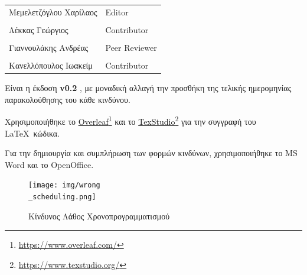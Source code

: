 \documentclass{../ol-softwaremanual}
\newcommand{\doclink}[2]{\href{#1}{#2}\footnote{\url{#1}}}
\begin{document}
	
	\vspace{20pt}
	
	\begin{table}[htbp!]
		\begin{tabular}{ll}
			Μεμελετζόγλου Χαρίλαος & \en Editor \\
			\\ Λέκκας Γεώργιος      &   \en  Contributor \\
			\\ Γιαννουλάκης Ανδρέας & \en Peer Reviewer \\
			\\ Κανελλόπουλος Ιωακείμ & \en Contributor \\ 
		\end{tabular}
	\end{table}
	
	\vspace{10pt}
	\flushleft
	Είναι η έκδοση \en \textbf{v0.2} \gr, με μοναδική αλλαγή την προσθήκη της τελικής ημερομηνίας παρακολούθησης του κάθε κινδύνου.
	
	
	
	
	
	\vspace{20pt}
	\flushleft
	Χρησιμοποιήθηκε το \en \doclink{https://www.overleaf.com/}{Overleaf} \gr και το \en \doclink{https://www.texstudio.org/}{TexStudio} \gr για την συγγραφή του \LaTeX\ κώδικα. \break
	
	Για την δημιουργία και συμπλήρωση των φορμών κινδύνων, χρησιμοποιήθηκε το \en MS Word \gr και το \en OpenOffice\gr.
	
	
	
	
	\newpage 
	
	
	\flushleft
	
	\begin{figure}[htbp!]
		\texttt{[image: img/wrong\\\_scheduling.png]}
		\caption{Κίνδυνος Λάθος Χρονοπρογραμματισμού}
	\end{figure}
	
	\newpage
	
	
	
\end{document}
